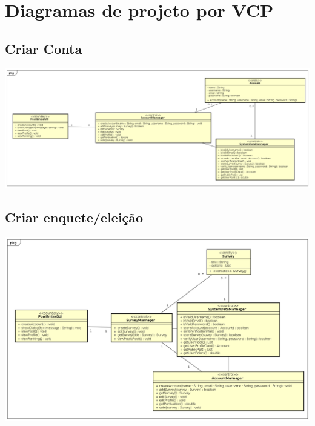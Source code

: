 \documentclass[a4paper,12pt]{report}
\begin{document}
\section*{Diagramas de projeto por VCP}
\markright{}

\subsection*{Criar Conta}
\markright{}
\includegraphics[width=14.3cm]{class_diagrams/ProjectClassDiagramCriarConta.png}

\subsection*{Criar enquete/eleição}
\markright{}
\includegraphics[width=14.3cm]{class_diagrams/ProjectClassDiagramCriarEnquete.png}
\end{document}
